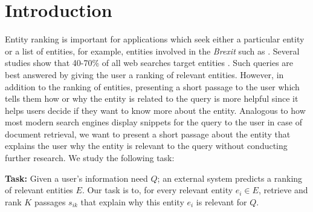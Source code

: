 \documentclass[sigconf,anonymous,review]{acmart}
\newcommand{\todo}[1]{ \PackageWarning{TODO:}{#1!}}
\begin{document}



%


%
\maketitle



\section{Introduction}
\label{sec:Introduction}

Entity ranking is important for applications which seek either a particular entity or a list of entities, for example, entities involved in the \textit{Brexit} such as .  Several studies show that 40-70\% of all web searches target entities \cite{guo2009named,balog2018entity}. Such queries are best answered by giving the user a ranking of relevant entities. However, in addition to the ranking of entities, presenting a short passage to the user which tells them how or why the entity is related to the query is more helpful since it helps users decide if they want to know more about the entity. Analogous to how most modern search engines display snippets for the query to the user in case of document retrieval, we want to present a short passage about the entity that explains the user why the entity is relevant to the query without conducting further research. We study the following task:

\textbf{Task:} Given a user's information need $Q$; an external system predicts a ranking of relevant entities $E$. Our task is to, for every relevant entity $e_i \in E$, retrieve and rank $K$ passages $s_{ik}$ that explain why this entity $e_i$ is relevant for $Q$. 
\end{document}
